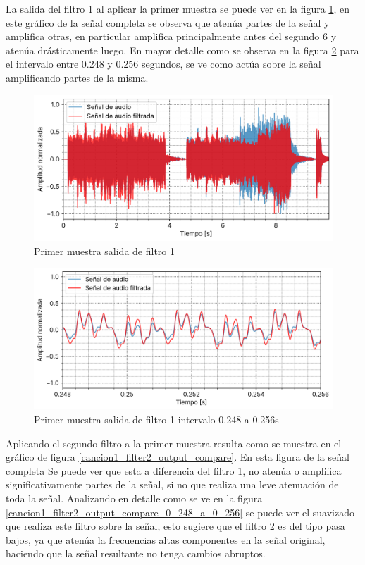 \documentclass[12pt]{article}
\begin{document}
La salida del filtro 1 al aplicar la primer muestra se puede ver en la
figura \ref{cancion1_filter1_output_compare}, en este gráfico de la señal completa se observa que atenúa partes de la señal y
amplifica otras, en particular amplifica principalmente antes del
segundo \(6\) y atenúa drásticamente luego. En mayor detalle como se observa en la figura \ref{cancion1_filter1_output_compare_0_248_a_0_256} para el intervalo entre 0.248 y 0.256 segundos, se ve como actúa sobre la señal amplificando partes de la misma.

\begin{figure}[H]
\centering
\includegraphics{plot/cancion1_filter1_output_compare.png}
\caption{Primer muestra salida de filtro 1}
\label{cancion1_filter1_output_compare}
\end{figure}

\begin{figure}[H]
\centering
\includegraphics{plot/cancion1_filter1_output_compare_0_248_a_0_256.png}
\caption{Primer muestra salida de filtro 1 intervalo 0.248 a 0.256s}
\label{cancion1_filter1_output_compare_0_248_a_0_256}
\end{figure}

Aplicando el segundo filtro a la primer muestra resulta como se muestra
en el gráfico de figura \ref{cancion1_filter2_output_compare}. 
En esta figura de la señal completa Se puede ver que esta a diferencia del filtro 1, no atenúa o amplifica significativamente partes de la señal, si no
que realiza una leve atenuación de toda la señal. Analizando en detalle como se ve en la figura \ref{cancion1_filter2_output_compare_0_248_a_0_256} se puede ver el suavizado que realiza este filtro sobre la señal, esto sugiere que el filtro 2 es del tipo pasa bajos, ya que atenúa la frecuencias altas componentes en la señal original, haciendo que la señal resultante no tenga cambios abruptos.
\end{document}
